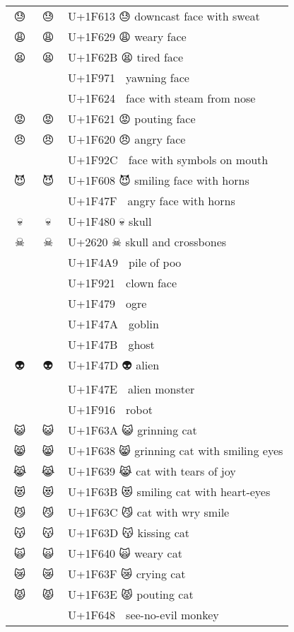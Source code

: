 \documentclass[a4paper,12pt]{ltjarticle}
\newcommand{\fontA}[1]{{\fontspec[RawFeature={mode=harf,+dist,+ccmp}]{Segoe UI Emoji} #1}}
\newcommand{\fontB}[1]{{\fontspec[RawFeature={mode=harf,+dist,+ccmp}]{Noto Color Emoji} #1}}
\begin{document}
\begin{longtable}[c]{ccp{0.8\linewidth}}
\fontA{😓}&\fontB{😓}&U+1F613 😓 downcast face with sweat\\
\fontA{😩}&\fontB{😩}&U+1F629 😩 weary face\\
\fontA{😫}&\fontB{😫}&U+1F62B 😫 tired face\\
\fontA{🥱}&\fontB{🥱}&U+1F971 🥱 yawning face\\
\fontA{😤}&\fontB{😤}&U+1F624 😤 face with steam from nose\\
\fontA{😡}&\fontB{😡}&U+1F621 😡 pouting face\\
\fontA{😠}&\fontB{😠}&U+1F620 😠 angry face\\
\fontA{🤬}&\fontB{🤬}&U+1F92C 🤬 face with symbols on mouth\\
\fontA{😈}&\fontB{😈}&U+1F608 😈 smiling face with horns\\
\fontA{👿}&\fontB{👿}&U+1F47F 👿 angry face with horns\\
\fontA{💀}&\fontB{💀}&U+1F480 💀 skull\\
\fontA{☠}&\fontB{☠}&U+2620 ☠ skull and crossbones\\
\fontA{💩}&\fontB{💩}&U+1F4A9 💩 pile of poo\\
\fontA{🤡}&\fontB{🤡}&U+1F921 🤡 clown face\\
\fontA{👹}&\fontB{👹}&U+1F479 👹 ogre\\
\fontA{👺}&\fontB{👺}&U+1F47A 👺 goblin\\
\fontA{👻}&\fontB{👻}&U+1F47B 👻 ghost\\
\fontA{👽}&\fontB{👽}&U+1F47D 👽 alien\\
\fontA{👾}&\fontB{👾}&U+1F47E 👾 alien monster\\
\fontA{🤖}&\fontB{🤖}&U+1F916 🤖 robot\\
\fontA{😺}&\fontB{😺}&U+1F63A 😺 grinning cat\\
\fontA{😸}&\fontB{😸}&U+1F638 😸 grinning cat with smiling eyes\\
\fontA{😹}&\fontB{😹}&U+1F639 😹 cat with tears of joy\\
\fontA{😻}&\fontB{😻}&U+1F63B 😻 smiling cat with heart-eyes\\
\fontA{😼}&\fontB{😼}&U+1F63C 😼 cat with wry smile\\
\fontA{😽}&\fontB{😽}&U+1F63D 😽 kissing cat\\
\fontA{🙀}&\fontB{🙀}&U+1F640 🙀 weary cat\\
\fontA{😿}&\fontB{😿}&U+1F63F 😿 crying cat\\
\fontA{😾}&\fontB{😾}&U+1F63E 😾 pouting cat\\
\fontA{🙈}&\fontB{🙈}&U+1F648 🙈 see-no-evil monkey\\

\end{longtable}
\end{document}
